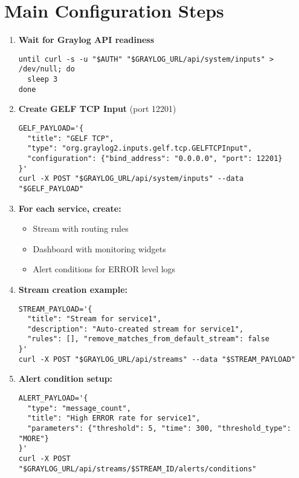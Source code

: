 \documentclass[12pt,a4paper]{report}
\begin{document}
\section*{Main Configuration Steps}

\begin{enumerate}
\item \textbf{Wait for Graylog API readiness}
\begin{Verbatim}[frame=single, fontsize=\scriptsize]
until curl -s -u "$AUTH" "$GRAYLOG_URL/api/system/inputs" > /dev/null; do
  sleep 3
done
\end{Verbatim}

\item \textbf{Create GELF TCP Input} (port 12201)
\begin{Verbatim}[frame=single, fontsize=\scriptsize]
GELF_PAYLOAD='{
  "title": "GELF TCP",
  "type": "org.graylog2.inputs.gelf.tcp.GELFTCPInput",
  "configuration": {"bind_address": "0.0.0.0", "port": 12201}
}'
curl -X POST "$GRAYLOG_URL/api/system/inputs" --data "$GELF_PAYLOAD"
\end{Verbatim}

\item \textbf{For each service, create:}
\begin{itemize}
\item Stream with routing rules
\item Dashboard with monitoring widgets
\item Alert conditions for ERROR level logs
\end{itemize}

\item \textbf{Stream creation example:}
\begin{Verbatim}[frame=single, fontsize=\scriptsize]
STREAM_PAYLOAD='{
  "title": "Stream for service1",
  "description": "Auto-created stream for service1",
  "rules": [], "remove_matches_from_default_stream": false
}'
curl -X POST "$GRAYLOG_URL/api/streams" --data "$STREAM_PAYLOAD"
\end{Verbatim}

\item \textbf{Alert condition setup:}
\begin{Verbatim}[frame=single, fontsize=\scriptsize]
ALERT_PAYLOAD='{
  "type": "message_count",
  "title": "High ERROR rate for service1",
  "parameters": {"threshold": 5, "time": 300, "threshold_type": "MORE"}
}'
curl -X POST "$GRAYLOG_URL/api/streams/$STREAM_ID/alerts/conditions"
\end{Verbatim}
\end{enumerate}
\end{document}
